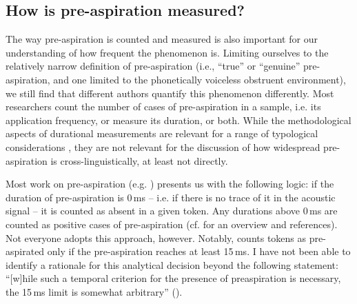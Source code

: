 \documentclass[output=paper]{langscibook}
\begin{document}
\subsection{How is pre-aspiration measured?}\label{sec:hejna:2.7}

The way pre\hyp aspiration is counted and measured is also important for our understanding of how frequent the phenomenon is. Limiting ourselves to the relatively narrow definition of pre\hyp aspiration (i.e., “true” or “genuine” pre-aspiration, and one limited to the phonetically voiceless obstruent environment), we still find that different authors quantify this phenomenon differently. Most researchers count the number of cases of pre\hyp aspiration in a sample, i.e. its application frequency, or measure its duration, or both. While the methodological aspects of durational measurements are relevant for a range of typological considerations \citep{Hejná2019}, they are not relevant for the discussion of how widespread pre\hyp aspiration is cross-linguistically, at least not directly.

Most work on pre\hyp aspiration (e.g. \citealt{Clayton2017, Morris2010}) presents us with the following logic: if the duration of pre\hyp aspiration is 0\,ms – i.e. if there is no trace of it in the acoustic signal – it is counted as absent in a given token. Any durations above 0\,ms are counted as positive cases of pre\hyp aspiration (cf. \citealt{Hejná2019} for an overview and references). Not everyone adopts this approach, however. Notably, \citet[152]{Helgason2002} counts tokens as pre-aspirated only if the pre\hyp aspiration reaches at least 15\,ms. I have not been able to identify a rationale for this analytical decision beyond the following statement: “[w]hile such a temporal criterion for the presence of preaspiration is necessary, the 15\,ms limit is somewhat arbitrary” (\citeyear[152]{Helgason2002}). 
\end{document}
